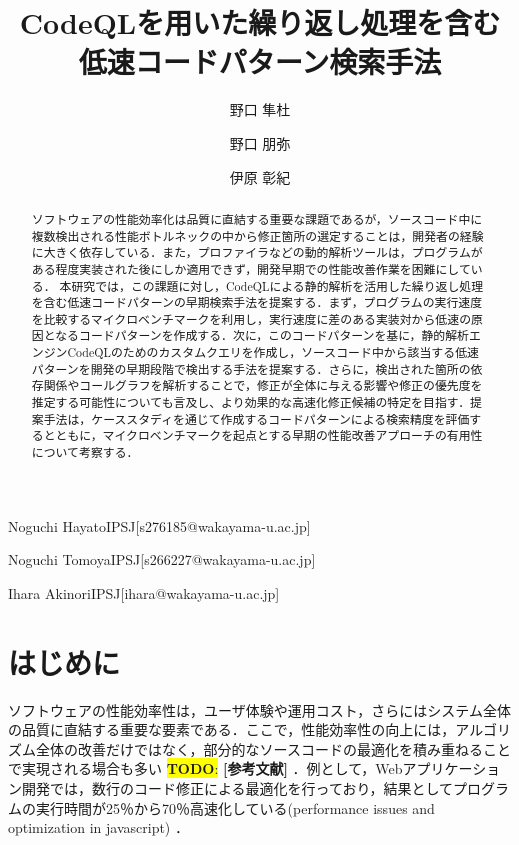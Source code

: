 \documentclass[submit,techrep,noauthor]{ipsj}
\newcommand{\todo}[1]{\colorbox{yellow}{{\bf TODO}:}{\color{red} {\textbf{[#1]}}}}
\begin{document}
\title{CodeQLを用いた繰り返し処理を含む
\\
低速コードパターン検索手法
}


\author{野口 隼杜}{Noguchi Hayato}{IPSJ}[s276185@wakayama-u.ac.jp]
\author{野口 朋弥}{Noguchi Tomoya}{IPSJ}[s266227@wakayama-u.ac.jp]
\author{伊原 彰紀}{Ihara Akinori}{IPSJ}[ihara@wakayama-u.ac.jp]

\begin{abstract}
ソフトウェアの性能効率化は品質に直結する重要な課題であるが，ソースコード中に複数検出される性能ボトルネックの中から修正箇所の選定することは，開発者の経験に大きく依存している．また，プロファイラなどの動的解析ツールは，プログラムがある程度実装された後にしか適用できず，開発早期での性能改善作業を困難にしている．
本研究では，この課題に対し，CodeQLによる静的解析を活用した繰り返し処理を含む低速コードパターンの早期検索手法を提案する．まず，プログラムの実行速度を比較するマイクロベンチマークを利用し，実行速度に差のある実装対から低速の原因となるコードパターンを作成する．次に，このコードパターンを基に，静的解析エンジンCodeQLのためのカスタムクエリを作成し，ソースコード中から該当する低速パターンを開発の早期段階で検出する手法を提案する．さらに，検出された箇所の依存関係やコールグラフを解析することで，修正が全体に与える影響や修正の優先度を推定する可能性についても言及し、より効果的な高速化修正候補の特定を目指す．提案手法は，ケーススタディを通じて作成するコードパターンによる検索精度を評価するとともに，マイクロベンチマークを起点とする早期の性能改善アプローチの有用性について考察する．
\end{abstract}


\maketitle

\section{はじめに}

 ソフトウェアの性能効率性は，ユーザ体験や運用コスト，さらにはシステム全体の品質に直結する重要な要素である．ここで，性能効率性の向上には，アルゴリズム全体の改善だけではなく，部分的なソースコードの最適化を積み重ねることで実現される場合も多い \todo{参考文献} ．例として，Webアプリケーション開発では，数行のコード修正による最適化を行っており，結果としてプログラムの実行時間が25％から70％高速化している(performance issues and optimization in javascript) ．
\end{document}
